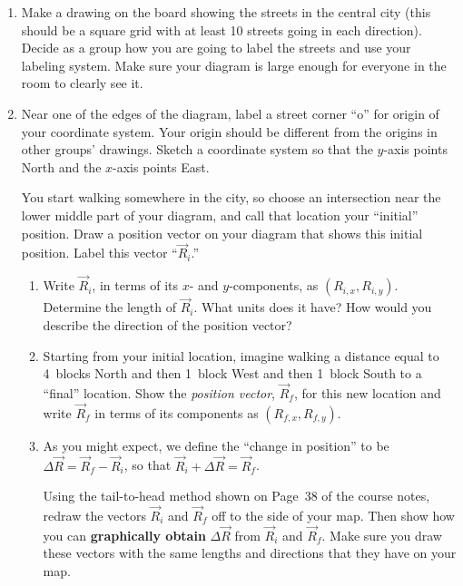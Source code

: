 \begin{enumerate}
	\item Make a drawing on the board showing the streets in the central city (this should be a square grid with at least 10 streets going in each direction). Decide as a group how you are going to label the streets and use your labeling system. Make sure your diagram is large enough for everyone in the room to clearly see it.

	\item Near one of the edges of the diagram, label a street corner ``o'' for origin of your coordinate system. Your origin should be different from the origins in other groups' drawings. Sketch a coordinate system so that the $y$-axis points North and the $x$-axis points East.
	
	You start walking somewhere in the city, so choose an intersection near the lower middle part of your diagram, and call that location your ``initial'' position. Draw a position vector on your diagram that shows this initial position. Label this vector ``$\vec{R}_i$.''
	
	\begin{enumerate}
		\item Write $\vec{R}_i$, in terms of its $x$- and $y$-components, as $\left(R_{i,x}, R_{i,y}\right)$. Determine the length of $\vec{R}_i$. What units does it have? How would you describe the direction of the position vector?

\WCD
\vspace{12pt}

		\item Starting from your initial location, imagine walking a distance equal to 4~blocks North and then 1~block West and then 1~block South to a ``final'' location. Show the \emph{position vector}, $\vec{R}_f$, for this new location and write $\vec{R}_f$ in terms of its components as $\left(R_{f,x}, R_{f,y}\right)$.
		
		\item As you might expect, we define the ``change in position'' to be $\Delta \vec{R} = \vec{R}_f - \vec{R}_i$, so that $\vec{R}_i + \Delta \vec{R} = \vec{R}_f$.
		
		Using the tail-to-head method shown on Page~38 of the course notes, redraw the vectors $\vec{R}_i$ and $\vec{R}_f$ off to the side of your map. Then show how you can \textbf{graphically obtain} $\Delta \vec{R}$ from $\vec{R}_i$ and $\vec{R}_f$. Make sure you draw these vectors with the same lengths and directions that they have on your map.
		

\end{enumerate}
\end{enumerate}
